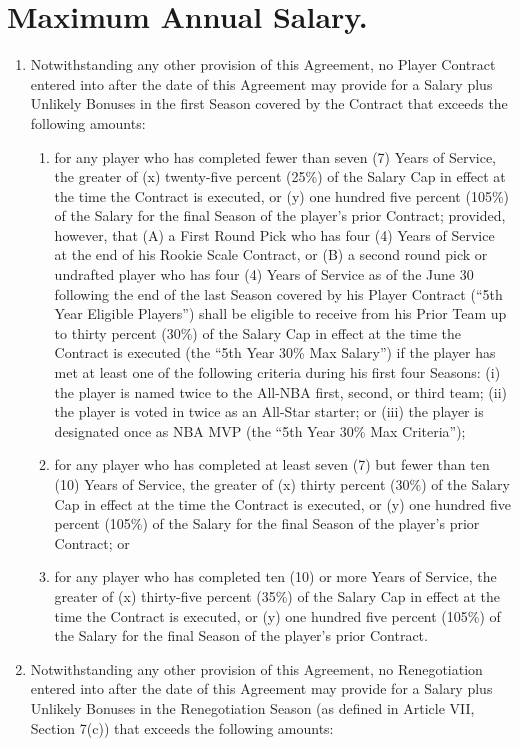 \documentclass[
]{book}
\providecommand{\tightlist}{%
  \setlength{\itemsep}{0pt}\setlength{\parskip}{0pt}}
\begin{document}
\hypertarget{maximum-annual-salary.}{%
\section{Maximum Annual Salary.}\label{maximum-annual-salary.}}

\begin{enumerate}
\def\labelenumi{(\alph{enumi})}
\tightlist
\item
  Notwithstanding any other provision of this Agreement, no Player Contract entered into after the date of this Agreement may provide for a Salary plus Unlikely Bonuses in the first Season covered by the Contract that exceeds the following amounts:

  \begin{enumerate}
  \def\labelenumii{(\roman{enumii})}
  \tightlist
  \item
    for any player who has completed fewer than seven (7) Years of Service, the greater of (x) twenty-five percent (25\%) of the Salary Cap in effect at the time the Contract is executed, or (y) one hundred five percent (105\%) of the Salary for the final Season of the player's prior Contract; provided, however, that (A) a First Round Pick who has four (4) Years of Service at the end of his Rookie Scale Contract, or (B) a second round pick or undrafted player who has four (4) Years of Service as of the June 30 following the end of the last Season covered by his Player Contract (``5th Year Eligible Players'') shall be eligible to receive from his Prior Team up to thirty percent (30\%) of the Salary Cap in effect at the time the Contract is executed (the ``5th Year 30\% Max Salary'') if the player has met at least one of the following criteria during his first four Seasons: (i) the player is named twice to the All-NBA first, second, or third team; (ii) the player is voted in twice as an All-Star starter; or (iii) the player is designated once as NBA MVP (the ``5th Year 30\% Max Criteria'');
  \item
    for any player who has completed at least seven (7) but fewer than ten (10) Years of Service, the greater of (x) thirty percent (30\%) of the Salary Cap in effect at the time the Contract is executed, or (y) one hundred five percent (105\%) of the Salary for the final Season of the player's prior Contract; or
  \item
    for any player who has completed ten (10) or more Years of Service, the greater of (x) thirty-five percent (35\%) of the Salary Cap in effect at the time the Contract is executed, or (y) one hundred five percent (105\%) of the Salary for the final Season of the player's prior Contract.
  \end{enumerate}
\item
  Notwithstanding any other provision of this Agreement, no Renegotiation entered into after the date of this Agreement may provide for a Salary plus Unlikely Bonuses in the Renegotiation Season (as defined in Article VII, Section 7(c)) that exceeds the following amounts:


\end{enumerate}
\end{document}
